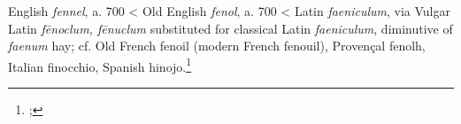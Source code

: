 \begin{etymology}\label{ety:fennel}
English \textit{fennel}, a. 700
< Old English \textit{fenol}, a. 700
< Latin \textit{faeniculum}, via Vulgar Latin \textit{fēnoclum, fēnuclum} substituted for classical Latin \textit{faeniculum}, diminutive of \textit{faenum} hay; cf. Old French fenoil (modern French fenouil), Provençal fenolh, Italian finocchio, Spanish hinojo.\footnote{\textcite[fennel]{oed}; }
\end{etymology}